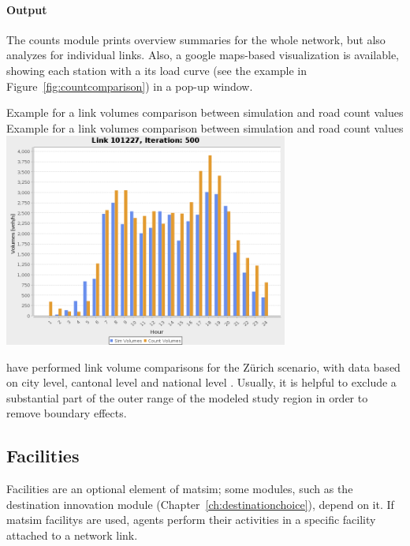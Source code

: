 \paragraph{Output}
The counts module prints overview summaries for the whole network, but also analyzes for individual links. Also, a google maps-based visualization is available, showing each station with a its load curve (see the example in Figure~\ref{fig:countcomparison}) in a pop-up window.

\createfigure%
{Example for a link volumes comparison between simulation and road count values}%
{Example for a link volumes comparison between simulation and road count values}%
{\label{fig:countcomparison}}%
{\includegraphics[width=0.7\textwidth, angle=0]{extending/figures/link101227.png}}%
{}


\citet[][]{BalmerEtAl_ResRep_bdktzrh_2009} have performed link volume comparisons for the Zürich scenario, with data based on city level, cantonal level and national level \citep[][]{ASTRA_Webpage_2006}.
Usually, it is helpful to exclude a substantial part of the outer range of the 
modeled study region in order to remove boundary effects.


\subsection{Facilities}
\label{sec:extending-facilities}
Facilities are an optional element of \gls{matsim}; some \glspl{module}, such as the destination innovation module (Chapter~\ref{ch:destinationchoice}), depend on it.
If \gls{matsim} \glspl{facility} are used, agents perform their activities in a specific \gls{facility} attached to a network link. 


